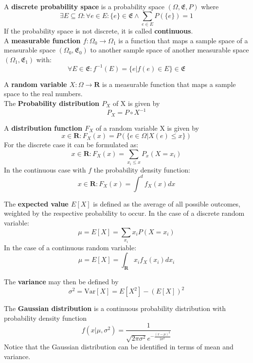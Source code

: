 A \textbf{discrete probability space} is a probability space $(\Omega, \mathfrak{E}, P)$ where 
\[ \exists E \subseteq \Omega: \forall e \in E: \{e\} \in \mathfrak{E} \wedge \sum_{e \in E} P(\{e\}) = 1\]
If the probability space is not discrete, it is called \textbf{continuous}. \\

A \textbf{measurable function $f:\Omega_0 \rightarrow \Omega_1$} is a function that maps a sample space of a measurable space $(\Omega_0, \mathfrak{E}_0)$ to another sample space of another measurable space $(\Omega_1, \mathfrak{E}_1)$ with:
\[ \forall E \in \mathfrak{E}: f^{-1}(E) = \{ e | f(e) \in E \} \in \mathfrak{E} \]

A \textbf{random variable $X: \Omega \rightarrow \mathbf{R}$} is a measurable function that maps a sample space to the real numbers. \\
The \textbf{Probability distribution $P_X$} of X is given by \[ P_X = P \circ X^{-1} \]

A \textbf{distribution function $F_X$} of a random variable X is given by \[ x \in \mathbf{R}: F_X(x) = P(\{e \in \Omega | X(e) \leq x\}) \]
For the discrete case it can be formulated as: \[ x \in \mathbf{R}: F_X(x) = \sum_{x_i \leq x} P_x (X = x_i) \]
In the continuous case with $f$ the probability density function: \[ x \in \mathbf{R}: F_X(x) = \int^d f_X(x) dx \]

The \textbf{expected value $E[X]$} is defined as the average of all possible outcomes, weighted by the respective probability to occur.
In the case of a discrete random variable: \[ \mu = E[X] = \sum_{x_i} x_i P(X=x_i)  \]
In the case of a continuous random variable: \[ \mu = E[X] = \int_{\mathbf{R}} x_i f_X(x_i)dx_i  \]

The \textbf{variance} may then be defined by \[ \sigma^2 = \text{Var}[X] = E[X^2] - (E[X])^2 \]

The \textbf{Gaussian distribution} is a continuous probability distribution with probability density function \[ f(x | \mu, \sigma^2) = \frac{1}{\sqrt{2 \pi \sigma^2}e^{-\frac{(x-\mu)^2}{2\sigma^2}}} \]
Notice that the Gaussian distribution can be identified in terms of mean and variance.